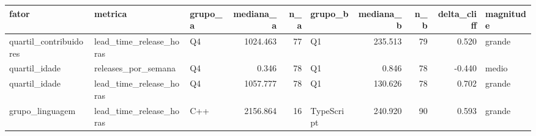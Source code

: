 \begin{tabular}{lllrrlrrrl}
\toprule
fator & metrica & grupo_a & mediana_a & n_a & grupo_b & mediana_b & n_b & delta_cliff & magnitude \\
\midrule
quartil_contribuidores & lead_time_release_horas & Q4 & 1024.463 & 77 & Q1 & 235.513 & 79 & 0.520 & grande \\
quartil_idade & releases_por_semana & Q4 & 0.346 & 78 & Q1 & 0.846 & 78 & -0.440 & medio \\
quartil_idade & lead_time_release_horas & Q4 & 1057.777 & 78 & Q1 & 130.626 & 78 & 0.702 & grande \\
grupo_linguagem & lead_time_release_horas & C++ & 2156.864 & 16 & TypeScript & 240.920 & 90 & 0.593 & grande \\
\bottomrule
\end{tabular}
